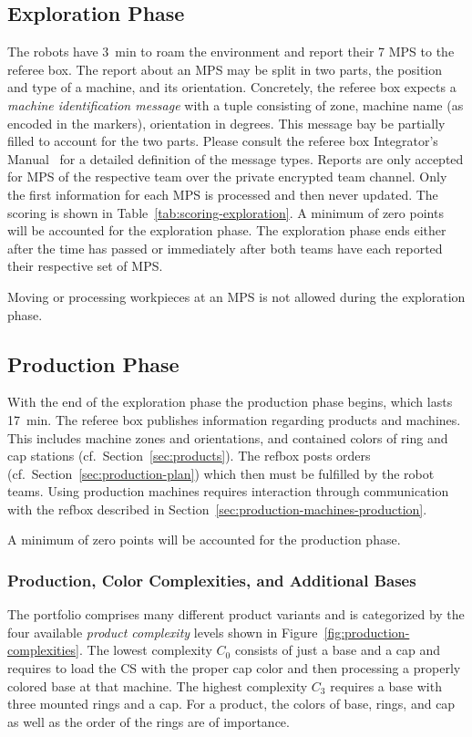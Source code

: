 \documentclass[12pt,twoside]{article}
\newcommand{\refsec}[1]{Section~\ref{#1}}
\newcommand{\reffig}[1]{Figure~\ref{#1}}
\newcommand{\reftab}[1]{Table~\ref{#1}}
\begin{document}
\subsection{Exploration Phase}
\label{sec:exploration-phase}
The robots have \SI{3}{\minute} to roam the environment and report
their 7 MPS to the referee box. The report about an MPS may be split
in two parts, the position and type of a machine, and its orientation.
Concretely, the referee box expects a \emph{machine identification
  message} with a tuple consisting of zone, machine name (as encoded
in the markers), orientation in degrees. This message bay be partially
filled to account for the two parts. Please consult the referee box
Integrator's Manual~\cite{RefBoxIntManual} for a detailed definition
of the message types. Reports are only accepted for MPS of the
respective team over the private encrypted team channel. Only the
first information for each MPS is processed and then never
updated. The scoring is shown in \reftab{tab:scoring-exploration}. A
minimum of zero points will be accounted for the exploration
phase. The exploration phase ends either after the time has passed or
immediately after both teams have each reported their respective set
of MPS.

Moving or processing workpieces at an MPS is not allowed during the
exploration phase.

\subsection{Production Phase}
\label{sec:production-phase}
With the end of the exploration phase the production phase begins,
which lasts \SI{17}{\minute}. The referee box publishes information
regarding products and machines. This includes machine zones and
orientations, and contained colors of ring and cap stations
(cf.~\refsec{sec:products}). The refbox posts orders
(cf.~\refsec{sec:production-plan}) which then must be fulfilled by the
robot teams. Using production machines requires interaction through
communication with the refbox described in
\refsec{sec:production-machines-production}.

A minimum of zero points will be accounted for the production phase.

\subsubsection{Production, Color Complexities, and Additional Bases}
\label{sec:production-complexities}
The portfolio comprises many different product variants and is
categorized by the four available \emph{product complexity} levels
shown in \reffig{fig:production-complexities}. The lowest complexity
$C_0$ consists of just a base and a cap and requires to load the CS
with the proper cap color and then processing a properly colored base
at that machine. The highest complexity $C_3$ requires a base with
three mounted rings and a cap. For a product, the colors of base,
rings, and cap as well as the order of the rings are of importance.
\end{document}
